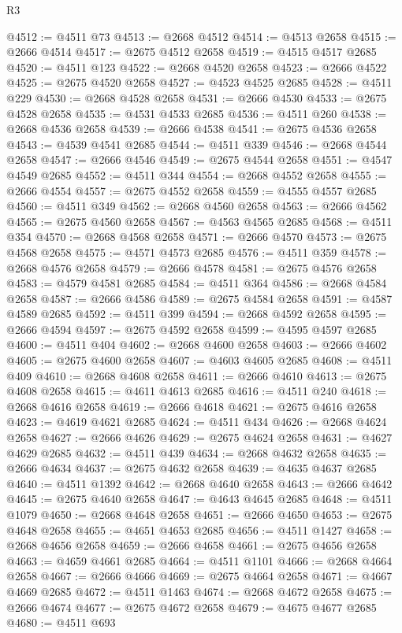 \begin{lexlean}{R3}
\begin{coremodule}
@4512 := @4511 @73
@4513 := @2668 @4512
@4514 := @4513 @2658
@4515 := @2666 @4514
@4517 := @2675 @4512 @2658
@4519 := @4515 @4517 @2685
@4520 := @4511 @123
@4522 := @2668 @4520 @2658
@4523 := @2666 @4522
@4525 := @2675 @4520 @2658
@4527 := @4523 @4525 @2685
@4528 := @4511 @229
@4530 := @2668 @4528 @2658
@4531 := @2666 @4530
@4533 := @2675 @4528 @2658
@4535 := @4531 @4533 @2685
@4536 := @4511 @260
@4538 := @2668 @4536 @2658
@4539 := @2666 @4538
@4541 := @2675 @4536 @2658
@4543 := @4539 @4541 @2685
@4544 := @4511 @339
@4546 := @2668 @4544 @2658
@4547 := @2666 @4546
@4549 := @2675 @4544 @2658
@4551 := @4547 @4549 @2685
@4552 := @4511 @344
@4554 := @2668 @4552 @2658
@4555 := @2666 @4554
@4557 := @2675 @4552 @2658
@4559 := @4555 @4557 @2685
@4560 := @4511 @349
@4562 := @2668 @4560 @2658
@4563 := @2666 @4562
@4565 := @2675 @4560 @2658
@4567 := @4563 @4565 @2685
@4568 := @4511 @354
@4570 := @2668 @4568 @2658
@4571 := @2666 @4570
@4573 := @2675 @4568 @2658
@4575 := @4571 @4573 @2685
@4576 := @4511 @359
@4578 := @2668 @4576 @2658
@4579 := @2666 @4578
@4581 := @2675 @4576 @2658
@4583 := @4579 @4581 @2685
@4584 := @4511 @364
@4586 := @2668 @4584 @2658
@4587 := @2666 @4586
@4589 := @2675 @4584 @2658
@4591 := @4587 @4589 @2685
@4592 := @4511 @399
@4594 := @2668 @4592 @2658
@4595 := @2666 @4594
@4597 := @2675 @4592 @2658
@4599 := @4595 @4597 @2685
@4600 := @4511 @404
@4602 := @2668 @4600 @2658
@4603 := @2666 @4602
@4605 := @2675 @4600 @2658
@4607 := @4603 @4605 @2685
@4608 := @4511 @409
@4610 := @2668 @4608 @2658
@4611 := @2666 @4610
@4613 := @2675 @4608 @2658
@4615 := @4611 @4613 @2685
@4616 := @4511 @240
@4618 := @2668 @4616 @2658
@4619 := @2666 @4618
@4621 := @2675 @4616 @2658
@4623 := @4619 @4621 @2685
@4624 := @4511 @434
@4626 := @2668 @4624 @2658
@4627 := @2666 @4626
@4629 := @2675 @4624 @2658
@4631 := @4627 @4629 @2685
@4632 := @4511 @439
@4634 := @2668 @4632 @2658
@4635 := @2666 @4634
@4637 := @2675 @4632 @2658
@4639 := @4635 @4637 @2685
@4640 := @4511 @1392
@4642 := @2668 @4640 @2658
@4643 := @2666 @4642
@4645 := @2675 @4640 @2658
@4647 := @4643 @4645 @2685
@4648 := @4511 @1079
@4650 := @2668 @4648 @2658
@4651 := @2666 @4650
@4653 := @2675 @4648 @2658
@4655 := @4651 @4653 @2685
@4656 := @4511 @1427
@4658 := @2668 @4656 @2658
@4659 := @2666 @4658
@4661 := @2675 @4656 @2658
@4663 := @4659 @4661 @2685
@4664 := @4511 @1101
@4666 := @2668 @4664 @2658
@4667 := @2666 @4666
@4669 := @2675 @4664 @2658
@4671 := @4667 @4669 @2685
@4672 := @4511 @1463
@4674 := @2668 @4672 @2658
@4675 := @2666 @4674
@4677 := @2675 @4672 @2658
@4679 := @4675 @4677 @2685
@4680 := @4511 @693

\end{coremodule}
\end{lexlean}
